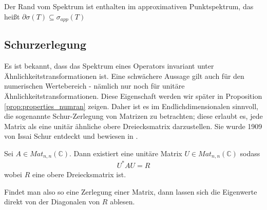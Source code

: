 \begin{lem} \label{lem:point_approx_spec}
    Der Rand vom Spektrum ist enthalten im approximativen Punktspektrum, das heißt $\partial \sigma(T) \subseteq \sigma_{app}(T)$
\end{lem}


\subsection{Schurzerlegung}

Es ist bekannt, dass das Spektrum eines Operators invariant unter Ähnlich\-keits\-trans\-for\-ma\-tionen ist. Eine schwächere Aussage gilt auch für den numerischen Wertebereich - nämlich nur noch für unitäre Ähnlichkeitstransformationen. Diese Eigenschaft werden wir später in Proposition \ref{prop:properties_numran} zeigen. Daher ist es im Endlichdimensionalen sinnvoll, die sogenannte Schur-Zerlegung von Matrizen zu betrachten; diese erlaubt es, jede Matrix als eine unitär ähnliche obere Dreiecksmatrix darzustellen. Sie wurde 1909 von Issai Schur entdeckt und bewiesen in \parencite{schur1909charakteristischen}.

\begin{thm}
    Sei $A \in Mat_{n,n}(\mathbb{C})$. Dann existiert eine unitäre Matrix $U\in Mat_{n,n}(\mathbb{C})$ sodass 
    \begin{align*}
        U^*AU = R
    \end{align*}
    wobei $R$ eine obere Dreiecksmatrix ist.
\end{thm}

Findet man also so eine Zerlegung einer Matrix, dann lassen sich die Eigenwerte direkt von der Diagonalen von $R$ ablesen.

